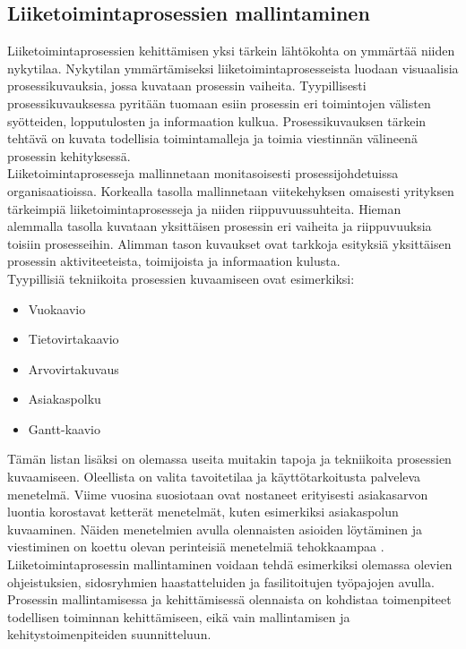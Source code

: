 \documentclass[finnish,12pt,a4paper,pdftex]{article}
\begin{document}
\subsection{Liiketoimintaprosessien mallintaminen}

Liiketoimintaprosessien kehittämisen yksi tärkein lähtökohta on ymmärtää niiden nykytilaa. Nykytilan ymmärtämiseksi liiketoimintaprosesseista luodaan visuaalisia prosessikuvauksia, jossa kuvataan prosessin vaiheita. Tyypillisesti prosessikuvauksessa pyritään tuomaan esiin prosessin eri toimintojen välisten syötteiden, lopputulosten ja informaation kulkua. Prosessikuvauksen tärkein tehtävä on kuvata todellisia toimintamalleja ja toimia viestinnän välineenä prosessin kehityksessä. \citep{ohjelmistotuotanto}\\

Liiketoimintaprosesseja mallinnetaan monitasoisesti prosessijohdetuissa organisaatioissa. Korkealla tasolla mallinnetaan viitekehyksen omaisesti yrityksen tärkeimpiä liiketoimintaprosesseja ja niiden riippuvuussuhteita. Hieman alemmalla tasolla kuvataan yksittäisen prosessin eri vaiheita ja riippuvuuksia toisiin prosesseihin. Alimman tason kuvaukset ovat tarkkoja esityksiä yksittäisen prosessin aktiviteeteista, toimijoista ja informaation kulusta. \citep{teollisuustalous} \\

Tyypillisiä tekniikoita prosessien kuvaamiseen ovat esimerkiksi:

\begin{itemize}
\setlength{\itemsep}{0pt}
    \item Vuokaavio
    \item Tietovirtakaavio
    \item Arvovirtakuvaus
    \item Asiakaspolku
    \item Gantt-kaavio
\end{itemize}

Tämän listan lisäksi on olemassa useita muitakin tapoja ja tekniikoita prosessien kuvaamiseen. Oleellista on valita tavoitetilaa ja käyttötarkoitusta palveleva menetelmä. Viime vuosina suosiotaan ovat nostaneet erityisesti asiakasarvon luontia korostavat ketterät menetelmät, kuten esimerkiksi asiakaspolun kuvaaminen. Näiden menetelmien avulla olennaisten asioiden löytäminen ja viestiminen on koettu olevan perinteisiä menetelmiä tehokkaampaa \citep{lamoureux}. \\

Liiketoimintaprosessin mallintaminen voidaan tehdä esimerkiksi olemassa olevien ohjeistuksien, sidosryhmien haastatteluiden ja fasilitoitujen työpajojen avulla. Prosessin mallintamisessa ja kehittämisessä olennaista on kohdistaa toimenpiteet todellisen toiminnan kehittämiseen, eikä vain mallintamisen ja kehitystoimenpiteiden suunnitteluun. \citep{ohjelmistotuotanto}\\
\end{document}

